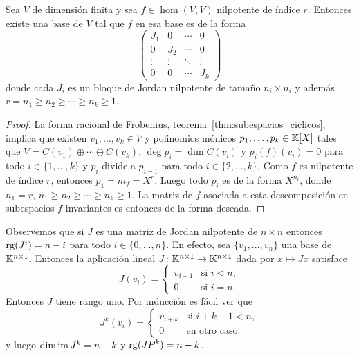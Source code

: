 \begin{thm}
    \label{thm:Jordan:nilpotente}
    Sea $V$ de dimensión finita y sea $f\in\hom(V,V)$ nilpotente de índice $r$.
    Entonces existe una base de $V$ tal que $f$ en esa base es de la forma 
	\[
		\begin{pmatrix}
			J_1 & 0 & \cdots & 0\\
			0 & J_2 & \cdots & 0\\
			\vdots & \vdots & \ddots & \vdots \\
			0 & 0 & \cdots & J_k
		\end{pmatrix}
	\]
	donde cada $J_i$ es un bloque de Jordan nilpotente de tamaño $n_{i}\times
	n_{i}$ y además $r=n_1\geq n_2\geq\cdots\geq n_k\geq1$. 

	\begin{proof}
        La forma racional de Frobenius, teorema~\ref{thm:subespacios_ciclicos},
        implica que existen $v_1,\dots,v_k\in V$ y polinomios mónicos 
        $p_1,\dots,p_k\in\mathbb{K}[X]$ tales que $V=C(v_1)\oplus\cdots\oplus C(v_k)$,
        $\deg p_i=\dim C(v_i)$ y $p_i(f)(v_i)=0$ para todo $i\in\{1,\dots,k\}$
        y $p_i$ divide a $p_{i-1}$ para todo $i\in\{2,\dots,k\}$. Como $f$ es
        nilpotente de índice $r$, entonces $p_1=m_f=X^r$. Luego todo $p_i$ es
        de la forma $X^{n_i}$, donde $n_1=r$, $n_1\geq n_2\geq\cdots\geq
        n_k\geq1$.  La matriz de $f$ asociada a esta descomposición en
        subespacios $f$-invariantes es entonces de la forma deseada.
	\end{proof}
\end{thm}

\begin{block}
    \label{block:rg(J^k)}
	Observemos que si $J$ es una matriz de Jordan nilpotente de $n\times n$
	entonces $\operatorname{rg} (J^i)=n-i$ para todo $i\in\{0,\dots,n\}$. En efecto, sea
	$\{v_1,\dots,v_n\}$ una base de $\mathbb{K}^{n\times1}$. Entonces la aplicación
	lineal $J\colon\mathbb{K}^{n\times 1}\to\mathbb{K}^{n\times1}$ dada por $x\mapsto Jx$
	satisface
    \[
    J(v_i)=\begin{cases}
        v_{i+1} & \text{si $i<n$},\\
        0 & \text{si $i=n$}.
    \end{cases}
    \]
    Entonces $J$ tiene rango uno. Por inducción es fácil ver que 
    \[
        J^k(v_i)=\begin{cases}
            v_{i+k} & \text{si $i+k-1<n$},\\
            0 & \text{en otro caso}.
        \end{cases}
    \]
    y luego $\dim\operatorname{im} J^k=n-k$ y $\operatorname{rg}(JP^k)=n-k$. 
\end{block}


